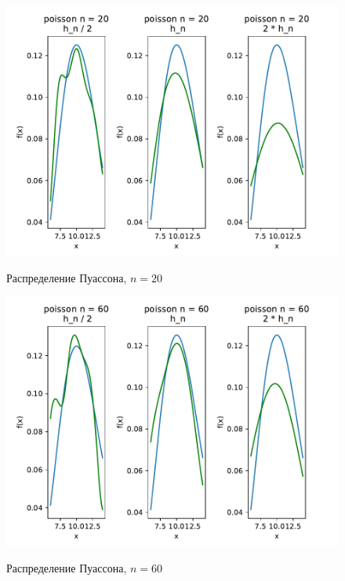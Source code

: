 \documentclass[a4paper]{article}
\begin{document}
\begin{figure}[H]
	\centering
	{\includegraphics[scale=0.5]{src_lab_4/kde_20_poisson}}
		\caption{Распределение Пуассона, $n=20$}
		\label{fig:kde_poisson_20}
	\end{figure}

\begin{figure}[H]
	\centering
	{\includegraphics[scale=0.5]{src_lab_4/kde_60_poisson}}
		\caption{Распределение Пуассона, $n=60$}
		\label{fig:kde_poisson_60}
	\end{figure}
\end{document}
